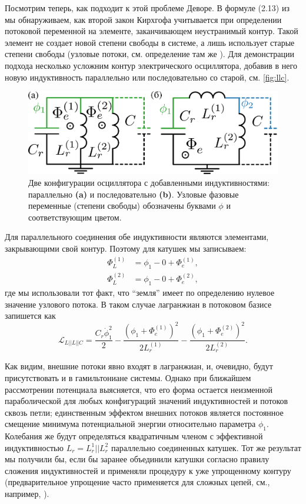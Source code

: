 \documentclass[14pt, a4paper]{extreport}
\numberwithin{equation}{section}
\begin{document}
Посмотрим теперь, как подходит к этой проблеме Деворе. В формуле (2.13) из \cite{devoret1995quantum} мы обнаруживаем, как второй закон Кирхгофа учитывается при определении потоковой переменной на элементе, заканчивающем неустранимый контур. Такой элемент не создает новой степени свободы в системе, а лишь использует старые степени свободы (узловые потоки, см. определение там же \cite{devoret1995quantum}). Для демонстрации подхода несколько усложним контур электрического осциллятора, добавив в него новую индуктивность параллельно или последовательно со старой, см. \autoref{fig:llc}.
\begin{figure}
	\centering
	\includegraphics[width=0.8\linewidth]{Pictures/LLC}
	\caption{Две конфигурации осциллятора с добавленными индуктивностями: параллельно \textbf{(a)} и последовательно \textbf{(b)}. Узловые фазовые переменные (степени свободы) обозначены буквами $\phi$ и соответствующим цветом.}
	\label{fig:llc}
\end{figure}

Для параллельного соединения обе индуктивности являются элементами, закрывающими свой контур. Поэтому для катушек мы записываем:
\begin{align}
	\Phi_L^{(1)} &= \phi_1 - 0 + \Phi_e^{(1)},\\
	\Phi_L^{(2)} &= \phi_1 - 0 + \Phi_e^{(2)},
\end{align}
где мы использовали тот факт, что ``земля'' имеет по определению нулевое значение узлового потока. В таком случае лагранжиан в потоковом базисе запишется как 
\begin{equation}
	\mathcal{L}_{L||L||C} = \frac{C_r \dot\phi_1^2}{2} - \frac{\left(\phi_1 + \Phi_e^{(1)}\right)^2}{2L_r^{(1)}} - \frac{\left(\phi_1 + \Phi_e^{(2)}\right)^2}{2 L_r^{(2)}}.
\end{equation}

Как видим, внешние потоки явно входят в лагранжиан, и, очевидно, будут присутствовать и в гамильтониане системы. Однако при ближайшем рассмотрении потенциала выясняется, что его форма остается неизменной параболической для любых конфигураций значений индуктивностей и потоков сквозь петли; единственным эффектом внешних потоков является постоянное смещение минимума потенциальной энергии относительно параметра $\phi_1$. Колебания же будут определяться квадратичным членом с эффективной индуктивностью $L_r = L_r^1 || L_r^2$ параллельно соединенных катушек. Тот же результат мы получили бы, если бы заранее объединили катушки согласно правилу сложения индуктивностей и применяли процедуру к уже упрощенному контуру (предварительное упрощение часто применяется для сложных цепей, см., например, \cite{koch2007charge}). 
\end{document}
